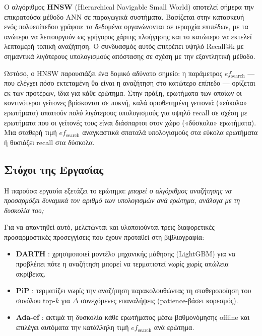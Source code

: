 \documentclass[12pt,a4paper]{article}
\begin{document}
Ο αλγόριθμος \textbf{HNSW} (Hierarchical Navigable Small World) \cite{malkov2018hnsw} αποτελεί σήμερα την επικρατούσα μέθοδο ANN σε παραγωγικά συστήματα. Βασίζεται στην κατασκευή ενός πολυεπίπεδου γράφου: τα δεδομένα οργανώνονται σε ιεραρχία επιπέδων, με τα ανώτερα να λειτουργούν ως γρήγορος χάρτης πλοήγησης και το κατώτερο να εκτελεί λεπτομερή τοπική αναζήτηση. Ο συνδυασμός αυτός επιτρέπει υψηλό Recall@k με σημαντικά λιγότερους υπολογισμούς απόστασης σε σχέση με την εξαντλητική μέθοδο.

Ωστόσο, ο HNSW παρουσιάζει ένα δομικό αδύνατο σημείο: η παράμετρος $ef_{\text{search}}$ --- που ελέγχει πόσο εκτεταμένη θα είναι η αναζήτηση στο κατώτερο επίπεδο --- ορίζεται εκ των προτέρων, ίδια για κάθε ερώτημα. Στην πράξη, ερωτήματα των οποίων οι κοντινότεροι γείτονες βρίσκονται σε πυκνή, καλά οριοθετημένη γειτονιά («εύκολα» ερωτήματα) απαιτούν πολύ λιγότερους υπολογισμούς για υψηλό recall σε σχέση με ερωτήματα που οι γείτονές τους είναι διάσπαρτοι στον χώρο («δύσκολα» ερωτήματα). Μια σταθερή τιμή $ef_{\text{search}}$ αναγκαστικά σπαταλά υπολογισμούς στα εύκολα ερωτήματα ή θυσιάζει recall στα δύσκολα.

\subsection{Στόχοι της Εργασίας}

Η παρούσα εργασία εξετάζει το ερώτημα: \textit{μπορεί ο αλγόριθμος αναζήτησης να προσαρμόζει δυναμικά τον αριθμό των υπολογισμών ανά ερώτημα, ανάλογα με τη δυσκολία του;}

Για να απαντηθεί αυτό, μελετώνται και υλοποιούνται τρεις διαφορετικές προσαρμοστικές προσεγγίσεις που έχουν προταθεί στη βιβλιογραφία:
\begin{itemize}
    \item {}\textbf{DARTH} \cite{chatzakis2025darth}: χρησιμοποιεί μοντέλο μηχανικής μάθησης (LightGBM) για να προβλέπει πότε η αναζήτηση μπορεί να τερματιστεί νωρίς χωρίς απώλεια ακρίβειας.
    \item {}\textbf{PiP} \cite{teofili2025pip}: τερματίζει νωρίς την αναζήτηση παρακολουθώντας τη σταθεροποίηση του συνόλου top-$k$ για $\Delta$ συνεχόμενες επαναλήψεις (patience-βάσει κορεσμός).
    \item {}\textbf{Ada-ef} \cite{zhang2026adaef}: εκτιμά τη δυσκολία κάθε ερωτήματος μέσω βαθμονόμησης offline και επιλέγει αυτόματα την κατάλληλη τιμή $ef_{\text{search}}$ ανά ερώτημα.
\end{itemize}
\end{document}
